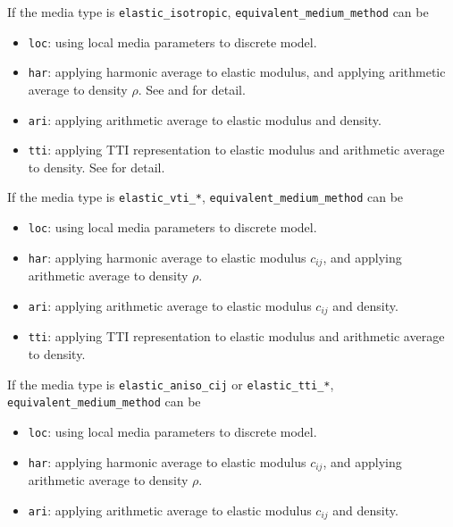 If the media type is \texttt{elastic\_isotropic}, \texttt{equivalent\_medium\_method} can be
\begin{itemize}
 \item \texttt{loc}: using local media parameters to discrete model. 
 \item \texttt{har}: applying harmonic average to elastic modulus, and applying arithmetic average to density $\rho$. See \citet{moczo_3d_2002} and \citep{moczo_finite-difference_2014} for detail.
 \item \texttt{ari}: applying arithmetic average to elastic modulus and density. 
 \item \texttt{tti}: applying TTI representation to elastic modulus and arithmetic average to density. See \citep{jiang2021tti} for detail. 
\end{itemize}

If the media type is \texttt{elastic\_vti\_*}, \texttt{equivalent\_medium\_method} can be
\begin{itemize}
 \item \texttt{loc}: using local media parameters to discrete model. 
 \item \texttt{har}: applying harmonic average to elastic modulus $c_{ij}$, and applying arithmetic average to density $\rho$.
 \item \texttt{ari}: applying arithmetic average to elastic modulus $c_{ij}$ and density. 
 \item \texttt{tti}: applying TTI representation to elastic modulus and arithmetic average to density.
\end{itemize}

If the media type is \texttt{elastic\_aniso\_cij} or \texttt{elastic\_tti\_*}, \texttt{equivalent\_medium\_method} can be
\begin{itemize}
 \item \texttt{loc}: using local media parameters to discrete model. 
 \item \texttt{har}: applying harmonic average to elastic modulus $c_{ij}$, and applying arithmetic average to density $\rho$.
 \item \texttt{ari}: applying arithmetic average to elastic modulus $c_{ij}$ and density. 
\end{itemize}
